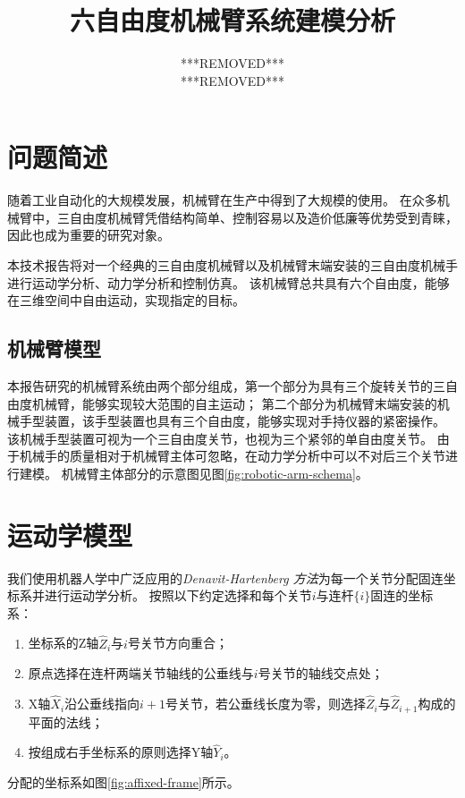 \documentclass{ctexart}
\title{六自由度机械臂系统建模分析}
\author{***REMOVED*** \\ ***REMOVED***}
\begin{document}
\maketitle

\section{问题简述}

随着工业自动化的大规模发展，机械臂在生产中得到了大规模的使用。
在众多机械臂中，三自由度机械臂凭借结构简单、控制容易以及造价低廉等优势受到青睐，因此也成为重要的研究对象。

本技术报告将对一个经典的三自由度机械臂以及机械臂末端安装的三自由度机械手进行运动学分析、动力学分析和控制仿真。
该机械臂总共具有六个自由度，能够在三维空间中自由运动，实现指定的目标。

\subsection{机械臂模型}



本报告研究的机械臂系统由两个部分组成，第一个部分为具有三个旋转关节的三自由度机械臂，能够实现较大范围的自主运动；
第二个部分为机械臂末端安装的机械手型装置，该手型装置也具有三个自由度，能够实现对手持仪器的紧密操作。
该机械手型装置可视为一个三自由度关节，也视为三个紧邻的单自由度关节。
由于机械手的质量相对于机械臂主体可忽略，在动力学分析中可以不对后三个关节进行建模。
机械臂主体部分的示意图见图\ref{fig:robotic-arm-schema}。

\section{运动学模型}

我们使用机器人学中广泛应用的\emph{Denavit-Hartenberg 方法}为每一个关节分配固连坐标系并进行运动学分析。
按照以下约定选择和每个关节$i$与连杆$\{i\}$固连的坐标系：
\begin{enumerate}
    \item 坐标系的Z轴$\hat Z_i$与$i$号关节方向重合；
    \item 原点选择在连杆两端关节轴线的公垂线与$i$号关节的轴线交点处；
    \item X轴$\hat X_i$沿公垂线指向$i+1$号关节，若公垂线长度为零，则选择$\hat Z_i$与$\hat Z_{i+1}$构成的平面的法线；
    \item 按组成右手坐标系的原则选择Y轴$\hat Y_i$。
\end{enumerate}
分配的坐标系如图\ref{fig:affixed-frame}所示。
\end{document}
